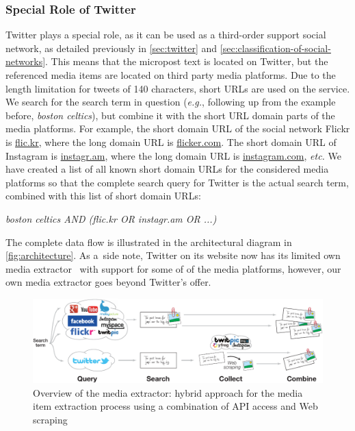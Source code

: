 \subsubsection{Special Role of Twitter}

Twitter plays a special role, as it can be used as
a third-order support social network,
as detailed previously in
\autoref{sec:twitter}
and \autoref{sec:classification-of-social-networks}.
This means that the micropost text is located on Twitter,
but the referenced media items are located
on third party media platforms.
Due to the length limitation for tweets of 140 characters,
short URLs are used on the service.
We search for the search term in question (\emph{e.g.},
following up from the example before, \emph{boston celtics}),
but combine it with the short URL domain parts of
the media platforms.
For example, the short domain URL of the social network Flickr
is \url{flic.kr}, where the long domain URL is \url{flicker.com}.
The short domain URL of Instagram is \url{instagr.am},
where the long domain URL is \url{instagram.com}, \emph{etc.}
We have created a list of all known short domain URLs for the 
considered media platforms so that the complete search query
for Twitter is the actual search term,
combined with this list of short domain URLs:

\emph{boston celtics AND (flic.kr OR instagr.am OR ...)}

\noindent The complete data flow is illustrated in the
architectural diagram in \autoref{fig:architecture}.
As a~side note, Twitter on its website now has its limited own
media extractor~\cite{wang2012twitter}
with support for some of of the media platforms,
however, our own media extractor goes beyond Twitter's offer.

\begin{figure}
  \centering
  \includegraphics[width=1.0\linewidth]{architecture.pdf}
  \caption{Overview of the media extractor:
    hybrid approach for the media item extraction process using
    a combination of API access and Web scraping}
  \label{fig:architecture}
\end{figure}

